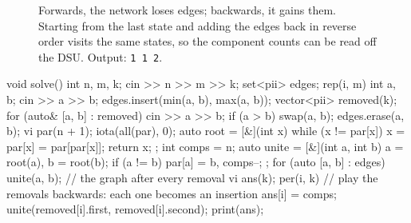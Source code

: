 \begin{figure}[htbp]
\centering
{}
\caption{Forwards, the network loses edges; backwards, it gains them. Starting from the last state and adding the edges
back in reverse order visits the same states, so the component counts can be read off the DSU. Output: \texttt{1 1 2}.}
\label{fig:reverse}
\end{figure}

\begin{code}
void solve() {
    int n, m, k;
    cin >> n >> m >> k;
    set<pii> edges;
    rep(i, m) {
        int a, b;
        cin >> a >> b;
        edges.insert({min(a, b), max(a, b)});
    }
    vector<pii> removed(k);
    for (auto& [a, b] : removed) {
        cin >> a >> b;
        if (a > b) swap(a, b);
        edges.erase({a, b});
    }
    vi par(n + 1);
    iota(all(par), 0);
    auto root = [&](int x) {
        while (x != par[x]) x = par[x] = par[par[x]];
        return x;
    };
    int comps = n;
    auto unite = [&](int a, int b) {
        a = root(a), b = root(b);
        if (a != b) par[a] = b, comps--;
    };
    for (auto [a, b] : edges) unite(a, b);  // the graph after every removal
    vi ans(k);
    per(i, k) {  // play the removals backwards: each one becomes an insertion
        ans[i] = comps;
        unite(removed[i].first, removed[i].second);
    }
    print(ans);
}
\end{code}

